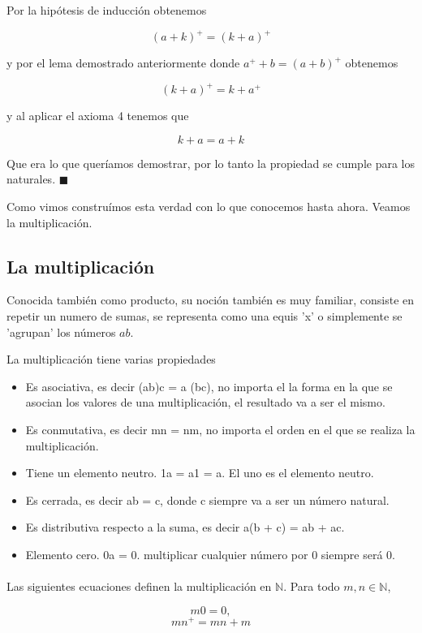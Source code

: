 \documentclass{article}
\begin{document}
Por la hipótesis de inducción obtenemos

$$(a + k)^+ = (k + a)^+$$

y por el lema demostrado anteriormente donde $a^+ + b = (a + b)^+$ obtenemos

$$(k + a)^+ = k + a^+$$

y al aplicar el axioma 4 tenemos que

$$k + a = a + k$$

Que era lo que queríamos demostrar, por lo tanto la propiedad se cumple para los naturales. $\blacksquare$

Como vimos construímos esta verdad con lo que conocemos hasta ahora. Veamos la multiplicación.

\subsection{La multiplicación}
Conocida también como producto, su noción también es muy familiar, consiste en repetir un numero de sumas, se representa como una equis 'x' o simplemente se 'agrupan' los números $ab$.

La multiplicación tiene varias propiedades

\begin{itemize}
    \item Es asociativa, es decir (ab)c = a (bc), no importa el la forma en la que se asocian los valores de una multiplicación, el resultado va a ser el mismo.
    \item Es conmutativa, es decir mn = nm, no importa el orden en el que se realiza la multiplicación.
    \item Tiene un elemento neutro.  1a = a1 = a. El uno es el elemento neutro.
    \item Es cerrada, es decir ab = c, donde c siempre va a ser un número natural.
    \item Es distributiva respecto a la suma, es decir a(b + c) = ab + ac.
    \item Elemento cero. 0a = 0. multiplicar cualquier número por 0 siempre será 0.
\end{itemize}

\paragraph{}Las siguientes ecuaciones definen la multiplicación en $\mathbb{N}$. Para todo $m,n \in \mathbb{N}$\cite{tnumprincip_2004},

$$m0=0,$$
$$mn^+ = mn + m$$
\end{document}
